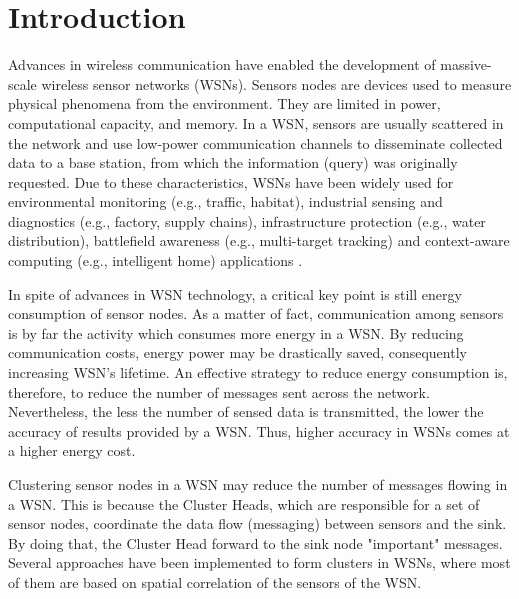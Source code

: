 \documentclass{acm_proc_article-sp}
\begin{document}





\section{Introduction}

Advances in wireless communication have enabled the development of massive-scale
wireless sensor networks (WSNs). Sensors nodes are devices used to measure
physical phenomena from the environment. They are limited in power,
computational capacity, and memory. In a WSN, sensors are usually scattered in
the network and use low-power communication channels to disseminate collected
data to a base station, from which the information (query) was originally
requested. Due to these characteristics, WSNs have been widely used for
environmental monitoring (e.g., traffic, habitat), industrial sensing and
diagnostics (e.g., factory, supply chains), infrastructure protection (e.g.,
water distribution), battlefield awareness (e.g., multi-target tracking) and
context-aware computing (e.g., intelligent home) applications
\cite{MaiaSAC2013}.
\vspace*{-.3cm}

In spite of advances in WSN technology, a critical key point is still energy
consumption of sensor nodes. As a matter of fact, communication among sensors is
by far the activity which consumes more energy in a WSN. By reducing
communication costs, energy power may be drastically saved, consequently
increasing WSN's lifetime. An effective strategy to reduce energy consumption
is, therefore, to reduce the number of messages sent across the network.
Nevertheless, the less the number of sensed data is transmitted, the lower the
accuracy of results provided by a WSN. Thus, higher accuracy in WSNs comes at a
higher energy cost.
\vspace*{-.3cm}

Clustering sensor nodes in a WSN may reduce the number of messages flowing in a
WSN. This is because the Cluster Heads, which are responsible for a set of
sensor nodes, coordinate the data flow (messaging) between sensors and the sink.
By doing that, the Cluster Head forward to the sink node "important" messages.
Several approaches have been implemented to form clusters in WSNs, where most of
them are based on spatial correlation of the sensors of the WSN.
\vspace*{-.3cm}
\end{document}
